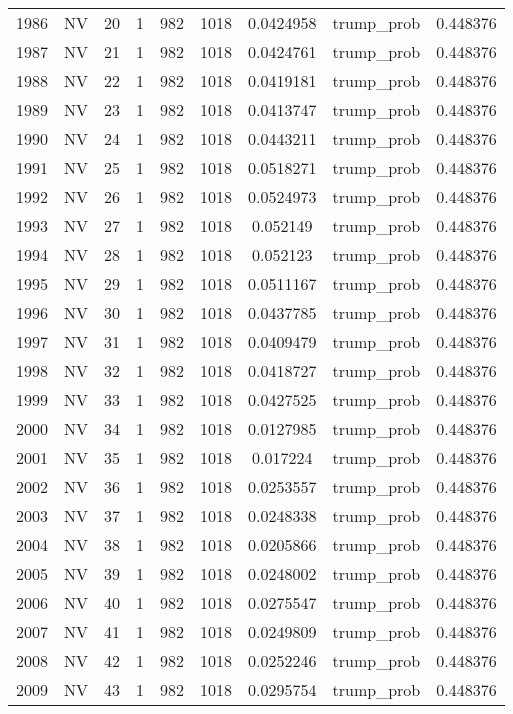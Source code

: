 \documentclass[12pt,a4paper]{article}
\begin{document}
\begin{tabular}{r|cccccccc}
	1986 & NV & 20 & 1 & 982 & 1018 & 0.0424958 & trump\_prob & 0.448376 \\
	1987 & NV & 21 & 1 & 982 & 1018 & 0.0424761 & trump\_prob & 0.448376 \\
	1988 & NV & 22 & 1 & 982 & 1018 & 0.0419181 & trump\_prob & 0.448376 \\
	1989 & NV & 23 & 1 & 982 & 1018 & 0.0413747 & trump\_prob & 0.448376 \\
	1990 & NV & 24 & 1 & 982 & 1018 & 0.0443211 & trump\_prob & 0.448376 \\
	1991 & NV & 25 & 1 & 982 & 1018 & 0.0518271 & trump\_prob & 0.448376 \\
	1992 & NV & 26 & 1 & 982 & 1018 & 0.0524973 & trump\_prob & 0.448376 \\
	1993 & NV & 27 & 1 & 982 & 1018 & 0.052149 & trump\_prob & 0.448376 \\
	1994 & NV & 28 & 1 & 982 & 1018 & 0.052123 & trump\_prob & 0.448376 \\
	1995 & NV & 29 & 1 & 982 & 1018 & 0.0511167 & trump\_prob & 0.448376 \\
	1996 & NV & 30 & 1 & 982 & 1018 & 0.0437785 & trump\_prob & 0.448376 \\
	1997 & NV & 31 & 1 & 982 & 1018 & 0.0409479 & trump\_prob & 0.448376 \\
	1998 & NV & 32 & 1 & 982 & 1018 & 0.0418727 & trump\_prob & 0.448376 \\
	1999 & NV & 33 & 1 & 982 & 1018 & 0.0427525 & trump\_prob & 0.448376 \\
	2000 & NV & 34 & 1 & 982 & 1018 & 0.0127985 & trump\_prob & 0.448376 \\
	2001 & NV & 35 & 1 & 982 & 1018 & 0.017224 & trump\_prob & 0.448376 \\
	2002 & NV & 36 & 1 & 982 & 1018 & 0.0253557 & trump\_prob & 0.448376 \\
	2003 & NV & 37 & 1 & 982 & 1018 & 0.0248338 & trump\_prob & 0.448376 \\
	2004 & NV & 38 & 1 & 982 & 1018 & 0.0205866 & trump\_prob & 0.448376 \\
	2005 & NV & 39 & 1 & 982 & 1018 & 0.0248002 & trump\_prob & 0.448376 \\
	2006 & NV & 40 & 1 & 982 & 1018 & 0.0275547 & trump\_prob & 0.448376 \\
	2007 & NV & 41 & 1 & 982 & 1018 & 0.0249809 & trump\_prob & 0.448376 \\
	2008 & NV & 42 & 1 & 982 & 1018 & 0.0252246 & trump\_prob & 0.448376 \\
	2009 & NV & 43 & 1 & 982 & 1018 & 0.0295754 & trump\_prob & 0.448376 \\

\end{tabular}
\end{document}
